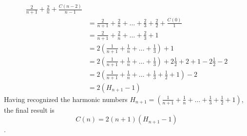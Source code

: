 \begin{description}
\begin{displaymath}
\begin{split}
      \frac{2}{n+1} +
      \frac{2}{n} + \frac{C(n-2)}{n-1}\\
      &= \frac{2}{n+1} + \frac{2}{n} + \ldots +
      \frac{2}{3} + \frac{2}{2} + \frac{C(0)}{1}\\
      &= \frac{2}{n+1} + \frac{2}{n} + \ldots +
      \frac{2}{3} + 1\\
      &= 2\left(\frac{1}{n+1} + \frac{1}{n} + \ldots +
        \frac{1}{3}\right) + 1\\
      &= 2\left(\frac{1}{n+1} + \frac{1}{n} + \ldots +
        \frac{1}{3}\right) +2\frac{1}{2} + 2
      + 1 -2\frac{1}{2} - 2\\
      &= 2\left(\frac{1}{n+1} + \frac{1}{n} + \ldots +
        \frac{1}{3}+
        \frac{1}{2}+
        1\right) -2 \\
      &= 2(H_{n+1}-1) 
    \end{split}
  \end{displaymath}
  Having recognized the harmonic numbers $H_{n+1}=\left(\frac{1}{n+1}
    + \frac{1}{n} + \ldots + \frac{1}{3}+ \frac{1}{2}+ 1\right)$, the
  final result is $$C(n) = 2(n+1)(H_{n+1}-1)$$.

\end{description}

 